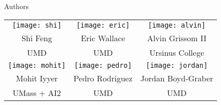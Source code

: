 \begin{frame}[c]{Authors}
\begin{center}
\begin{tabular}{ccc}
\texttt{[image: shi]}   & \texttt{[image: eric]}  & \texttt{[image: alvin]} \\
    Shi Feng & Eric Wallace & Alvin Grissom II \\
    UMD & UMD & Ursinus College \\
\texttt{[image: mohit]} & \texttt{[image: pedro]} & \texttt{[image: jordan]} \\
    Mohit Iyyer & Pedro Rodriguez & Jordan Boyd-Graber \\
    UMass + AI2 & UMD & UMD
\end{tabular}
\end{center}
\end{frame}

